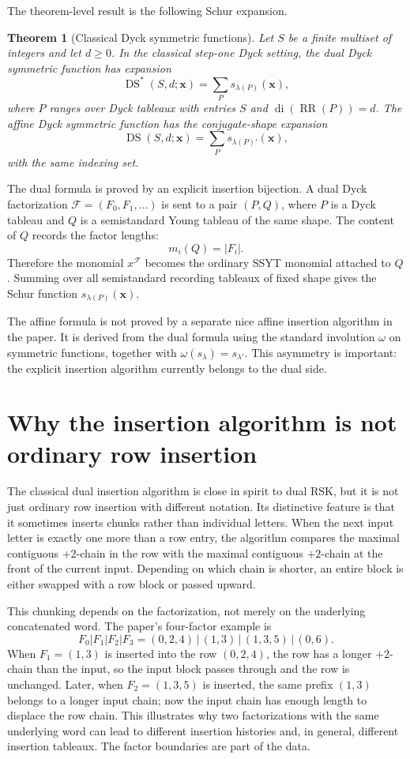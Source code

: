 \documentclass{article}
\DeclareMathOperator{\di}{di}
\DeclareMathOperator{\RR}{RR}
\newcommand{\DS}{\operatorname{DS}}
\newcommand{\DSstar}{\operatorname{DS}^{\ast}}
\newtheorem{theorem}{Theorem}
\begin{document}
The theorem-level result is the following Schur expansion.

\begin{theorem}[Classical Dyck symmetric functions]
Let \(S\) be a finite multiset of integers and let \(d\ge0\).  In the
classical step-one Dyck setting, the dual Dyck symmetric function has expansion
\[
  \DSstar(S,d;\mathbf x)
  =
  \sum_P s_{\lambda(P)}(\mathbf x),
\]
where \(P\) ranges over Dyck tableaux with entries \(S\) and
\(\di(\RR(P))=d\).  The affine Dyck symmetric function has the conjugate-shape
expansion
\[
  \DS(S,d;\mathbf x)
  =
  \sum_P s_{\lambda(P)'}(\mathbf x),
\]
with the same indexing set.
\end{theorem}

The dual formula is proved by an explicit insertion bijection.  A dual Dyck
factorization \(\mathcal F=(F_0,F_1,\ldots)\) is sent to a pair \((P,Q)\),
where \(P\) is a Dyck tableau and \(Q\) is a semistandard Young tableau of the
same shape.  The content of \(Q\) records the factor lengths:
\[
  m_i(Q)=|F_i|.
\]
Therefore the monomial \(x^{\mathcal F}\) becomes the ordinary SSYT monomial
attached to \(Q\).  Summing over all semistandard recording tableaux of fixed
shape gives the Schur function \(s_{\lambda(P)}(\mathbf x)\).

The affine formula is not proved by a separate nice affine insertion algorithm
in the paper.  It is derived from the dual formula using the standard
involution \(\omega\) on symmetric functions, together with
\(\omega(s_\lambda)=s_{\lambda'}\).  This asymmetry is important: the explicit
insertion algorithm currently belongs to the dual side.

\section{Why the insertion algorithm is not ordinary row insertion}

The classical dual insertion algorithm is close in spirit to dual RSK, but it
is not just ordinary row insertion with different notation.  Its distinctive
feature is that it sometimes inserts chunks rather than individual letters.
When the next input letter is exactly one more than a row entry, the algorithm
compares the maximal contiguous \(+2\)-chain in the row with the maximal
contiguous \(+2\)-chain at the front of the current input.  Depending on which
chain is shorter, an entire block is either swapped with a row block or passed
upward.

This chunking depends on the factorization, not merely on the underlying
concatenated word.  The paper's four-factor example is
\[
  F_0|F_1|F_2|F_3
  =
  (0,2,4)\,|\,(1,3)\,|\,(1,3,5)\,|\,(0,6).
\]
When \(F_1=(1,3)\) is inserted into the row \((0,2,4)\), the row has a longer
\(+2\)-chain than the input, so the input block passes through and the row is
unchanged.  Later, when \(F_2=(1,3,5)\) is inserted, the same prefix
\((1,3)\) belongs to a longer input chain; now the input chain has enough
length to displace the row chain.  This illustrates why two factorizations
with the same underlying word can lead to different insertion histories and,
in general, different insertion tableaux.  The factor boundaries are part of
the data.
\end{document}
